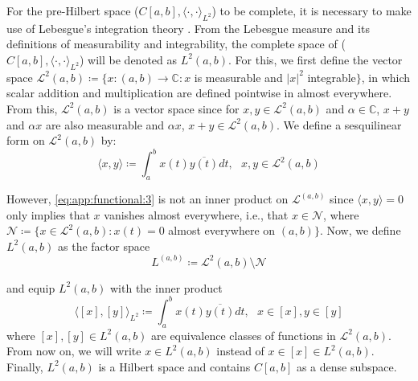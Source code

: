 			For the pre-Hilbert space ($C[a,b],\langle\cdot,\cdot\rangle_{L^2}$) to be complete, it is necessary to make use of Lebesgue's integration theory \citep{bartle1995elements}. From the Lebesgue measure and its definitions of measurability and integrability, the complete space of ($C[a,b],\langle\cdot,\cdot\rangle_{L^2}$) will be denoted as $L^2(a,b)$. For this, we first define the vector space $\mathcal{L}^2(a,b) \coloneqq \{x : (a,b)\rightarrow\mathbb{C} : x$ is measurable and $|x|^2$ integrable$\}$, in which scalar addition and multiplication are defined pointwise in almost everywhere. From this, $\mathcal{L}^2(a,b)$ is a vector space since for $x,y\in\mathcal{L}^2(a,b)$ and $\alpha\in\mathbb{C}$, $x+y$ and $\alpha x$ are also measurable and $\alpha x$, $x+y \in \mathcal{L}^2(a,b)$. We define a sesquilinear form on $\mathcal{L}^2(a,b)$ by:
			\begin{equation}
				\langle x,y \rangle\coloneqq\int_a^bx(t)\overline{y(t)}dt,~~~x,y\in\mathcal{L}^2(a,b) \label{eq:app:functional:3}
			\end{equation} 
		
			However, \eqref{eq:app:functional:3} is not an inner product on $\mathcal{L}^(a,b)$ since $\langle x,y \rangle = 0$ only implies that $x$ vanishes almost everywhere, i.e., that $x\in\mathcal{N}$, where $\mathcal{N}\coloneqq\{x\in\mathcal{L}^2(a,b):x(t)=0$ almost everywhere on $(a,b)\}$. Now, we define $L^2(a,b)$ as the factor space
			\begin{equation}
				L^(a,b)\coloneqq\mathcal{L}^2(a,b)\setminus\mathcal{N} \label{eq:app:functional:L2}
			\end{equation}
	
			\noindent and equip $L^2(a,b)$ with the inner product $$\langle[x],[y]\rangle_{L^2}\coloneqq\int_a^bx(t)\overline{y(t)}dt,~~~x\in[x], y\in[y]$$ where $[x],[y]\in L^2(a,b)$ are equivalence classes of functions in $\mathcal{L}^2(a,b)$. From now on, we will write $x\in L^2(a,b)$ instead of $x\in[x]\in L^2(a,b)$. Finally, $L^2(a,b)$ is a Hilbert space and contains $C[a,b]$ as a dense subspace.

